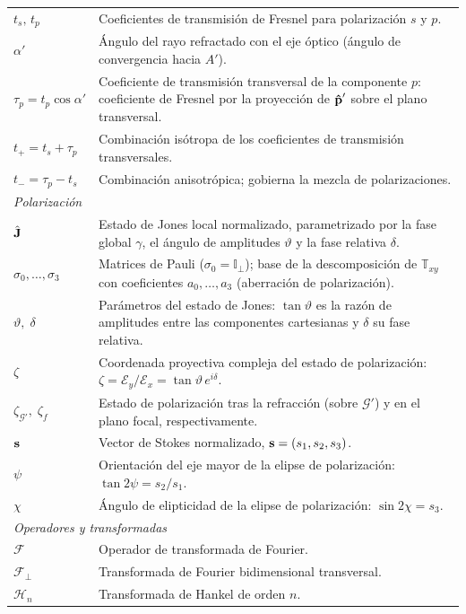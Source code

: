 \begin{longtable}{p{} p{}}
\hline
$t_s,\,t_p$ & Coeficientes de transmisión de Fresnel para polarización $s$ y $p$. \\
$\alpha'$ & Ángulo del rayo refractado con el eje óptico (ángulo de convergencia hacia $A'$). \\
$\tau_p = t_p\cos\alpha'$ & Coeficiente de transmisión transversal de la componente $p$: coeficiente de Fresnel por la proyección de $\bm{\hat{\mathbf{p}}}'$ sobre el plano transversal. \\
$t_+ = t_s+\tau_p$ & Combinación isótropa de los coeficientes de transmisión transversales. \\
$t_- = \tau_p-t_s$ & Combinación anisotrópica; gobierna la mezcla de polarizaciones. \\
\hline
\multicolumn{2}{l}{\textit{Polarización}} \\
\hline
$\hat{\vb J}$ & Estado de Jones local normalizado, parametrizado por la fase global $\gamma$, el ángulo de amplitudes $\vartheta$ y la fase relativa $\delta$. \\
$\sigma_0,\ldots,\sigma_3$ & Matrices de Pauli ($\sigma_0=\mathbb I_\perp$); base de la descomposición de $\mathbb T_{xy}$ con coeficientes $a_0,\ldots,a_3$ (aberración de polarización). \\
$\vartheta,\;\delta$ & Parámetros del estado de Jones: $\tan\vartheta$ es la razón de amplitudes entre las componentes cartesianas y $\delta$ su fase relativa. \\
$\zeta$ & Coordenada proyectiva compleja del estado de polarización: $\zeta=\mathscr E_y/\mathscr E_x=\tan\vartheta\,e^{i\delta}$. \\
$\zeta_{\mathscr G'},\;\zeta_f$ & Estado de polarización tras la refracción (sobre $\mathscr G'$) y en el plano focal, respectivamente. \\
$\vb s$ & Vector de Stokes normalizado, $\vb s=(s_1,s_2,s_3)$. \\
$\psi$ & Orientación del eje mayor de la elipse de polarización: $\tan 2\psi=s_2/s_1$. \\
$\chi$ & Ángulo de elipticidad de la elipse de polarización: $\sin 2\chi=s_3$. \\
\hline
\multicolumn{2}{l}{\textit{Operadores y transformadas}} \\
\hline
$\mathscr F$ & Operador de transformada de Fourier. \\
$\mathscr F_\perp$ & Transformada de Fourier bidimensional transversal. \\
$\mathscr H_n$ & Transformada de Hankel de orden $n$. \\

\end{longtable}
